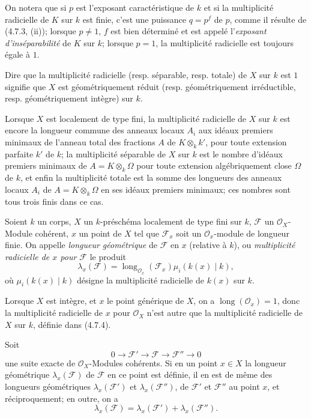 On notera que si $p$ est l'exposant caractéristique de $k$ et si la
multiplicité radicielle de $K$ sur $k$ est finie, c'est une puissance $q=p^f$
de $p$, comme il résulte de (4.7.3, (ii)); lorsque $p\ne1$, $f$ est bien
déterminé et est appelé l'\emph{exposant d'inséparabilité} de $K$ sur $k$;
lorsque $p=1$, la multiplicité radicielle est toujours égale à $1$.

Dire que la multiplicité radicielle (resp. séparable, resp. totale) de $X$ sur
$k$ est $1$ signifie que $X$ est géométriquement réduit (resp.
géométriquement irréductible, resp. géométriquement intègre) sur $k$.

Lorsque $X$ est localement de type fini, la multiplicité radicielle de $X$ sur
$k$ est encore la longueur commune des anneaux locaux $A_i$ aux idéaux
premiers minimaux de l'anneau total des fractions $A$ de $K\otimes_k k'$,
pour toute extension parfaite $k'$ de $k$; la multiplicité séparable de $X$
sur $k$ est le nombre d'idéaux premiers minimaux de $A=K\otimes_k\Omega$ pour
toute extension algébriquement close $\Omega$ de $k$, et enfin la multiplicité
totale est la somme des longueurs des anneaux locaux $A_i$ de
$A=K\otimes_k\Omega$ en ses idéaux premiers minimaux; ces nombres sont tous
trois finis dans ce cas.

\begin{definition}[4.7.5]
\label{IV.2.4.7.5-fr}
Soient $k$ un corps, $X$ un $k$-préschéma localement de type fini sur $k$,
$\mathscr F$ un $\mathcal O_X$-Module cohérent, $x$ un point de $X$ tel que
$\mathscr F_x$ soit un $\mathcal O_x$-module de longueur finie. On appelle
\emph{longueur géométrique} de $\mathscr F$ en $x$ (relative à $k$), ou
\emph{multiplicité radicielle de $x$ pour $\mathscr F$} le produit
\[
\lambda_x(\mathscr F)
=\operatorname{long}_{\mathcal O_x}(\mathscr F_x)\mu_i(k(x)\mid k),
\]
où $\mu_i(k(x)\mid k)$ désigne la multiplicité radicielle de $k(x)$ sur $k$.
\end{definition}

Lorsque $X$ est intègre, et $x$ le point générique de $X$, on a
$\operatorname{long}(\mathcal O_x)=1$, donc la multiplicité radicielle de $x$
pour $\mathcal O_X$ n'est autre que la multiplicité radicielle de $X$ sur $k$,
définie dans (4.7.4).


\begin{proposition}[4.7.6]
\label{IV.2.4.7.6-fr}
Soit
\[
0\longrightarrow\mathscr F'\longrightarrow\mathscr F
\longrightarrow\mathscr F''\longrightarrow0
\]
une suite exacte de $\mathcal O_X$-Modules cohérents. Si en un point $x\in X$
la longueur géométrique $\lambda_x(\mathscr F)$ de $\mathscr F$ en ce point
est définie, il en est de même des longueurs géométriques
$\lambda_x(\mathscr F')$ et $\lambda_x(\mathscr F'')$, de $\mathscr F'$ et
$\mathscr F''$ au point $x$, et réciproquement; en outre, on a
\begin{equation}
\lambda_x(\mathscr F)=\lambda_x(\mathscr F')+\lambda_x(\mathscr F'').
\tag{4.7.6.1}
\label{IV.2.4.7.6.1-fr}
\end{equation}
\end{proposition}

